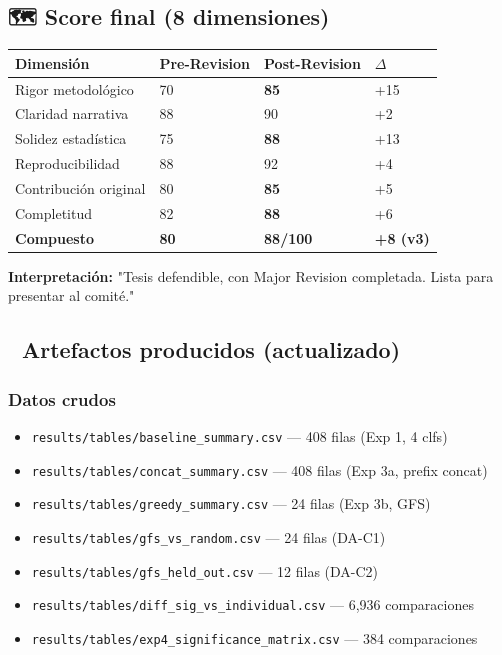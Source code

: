 \subsection{🗺️ Score final (8 dimensiones)}

\begin{table}[h]
\centering
\begin{tabular}{llll}
\toprule
Dimensión & Pre-Revision & Post-Revision & $\Delta$ \\
\midrule
Rigor metodológico & 70 & \textbf{85} & +15 \\
Claridad narrativa & 88 & 90 & +2 \\
Solidez estadística & 75 & \textbf{88} & +13 \\
Reproducibilidad & 88 & 92 & +4 \\
Contribución original & 80 & \textbf{85} & +5 \\
Completitud & 82 & \textbf{88} & +6 \\
\textbf{Compuesto} & \textbf{80} & \textbf{88/100} & \textbf{+8 (v3)} \\
\bottomrule
\end{tabular}
\end{table}

\textbf{Interpretación:} "Tesis defendible, con Major Revision completada. Lista para presentar al comité."

\hrulefill

\subsection{📁 Artefactos producidos (actualizado)}

\subsubsection{Datos crudos}
\begin{itemize}
  \item \texttt{results/tables/baseline\_summary.csv} --- 408 filas (Exp 1, 4 clfs)
  \item \texttt{results/tables/concat\_summary.csv} --- 408 filas (Exp 3a, prefix concat)
  \item \texttt{results/tables/greedy\_summary.csv} --- 24 filas (Exp 3b, GFS)
  \item \texttt{results/tables/gfs\_vs\_random.csv} --- 24 filas (DA-C1)
  \item \texttt{results/tables/gfs\_held\_out.csv} --- 12 filas (DA-C2)
  \item \texttt{results/tables/diff\_sig\_vs\_individual.csv} --- 6,936 comparaciones
  \item \texttt{results/tables/exp4\_significance\_matrix.csv} --- 384 comparaciones
\end{itemize}

